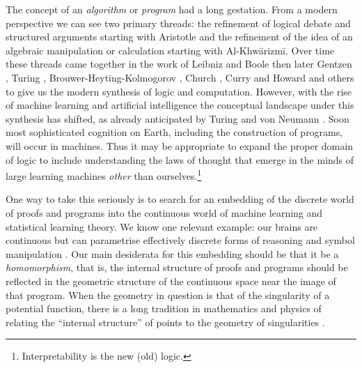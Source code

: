 \documentclass[english,letter paper,12pt,reqno]{article}
\theoremstyle{definition}
\begin{document}
The concept of an \emph{algorithm} or \emph{program} had a long gestation. From a modern perspective we can see two primary threads: the refinement of logical debate and structured arguments starting with Aristotle and the refinement of the idea of an algebraic manipulation or calculation starting with Al-Khw\={a}rizm\={i}. Over time these threads came together in the work of Leibniz and Boole \cite{boole1854laws} then later Gentzen \cite{gentzen1935untersuchungen}, Turing \cite{turing1936computable}, Brouwer-Heyting-Kolmogorov \cite{troelstra2011history}, Church \cite{church1932set}, Curry and Howard \cite{howard1980formulae} and others to give us the modern synthesis of logic and computation. However, with the rise of machine learning and artificial intelligence the conceptual landscape under this synthesis has shifted, as already anticipated by Turing \cite{turing1948intelligent} and von Neumann \cite{von1958computer, vonNeumann1963}. Soon most sophisticated cognition on Earth, including the construction of programs, will occur in machines. Thus it may be appropriate to expand the proper domain of logic to include understanding the laws of thought that emerge in the minds of large learning machines \emph{other} than ourselves.\footnote{Interpretability is the new (old) logic.}

One way to take this seriously is to search for an embedding of the discrete world of proofs and programs into the continuous world of machine learning and statistical learning theory. We know one relevant example: our brains are continuous but can parametrise effectively discrete forms of reasoning and symbol manipulation \cite{von1958computer}. Our main desiderata for this embedding should be that it be a \emph{homomorphism}, that is, the internal structure of proofs and programs should be reflected in the geometric structure of the continuous space near the image of that program. When the geometry in question is that of the singularity of a potential function, there is a long tradition in mathematics and physics of relating the ``internal structure'' of points to the geometry of singularities \cite{cecotti1993classification,cartier2001mad,greuel2007singularity,arnold2012singularities}.
\\
\end{document}
